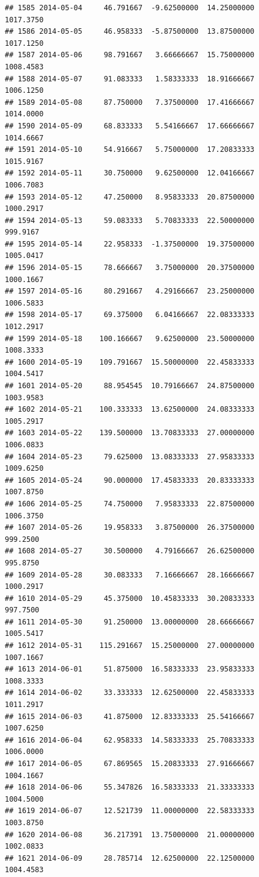 \documentclass[
]{article}
\begin{document}
\begin{verbatim}
## 1585 2014-05-04     46.791667  -9.62500000  14.25000000    1017.3750
## 1586 2014-05-05     46.958333  -5.87500000  13.87500000    1017.1250
## 1587 2014-05-06     98.791667   3.66666667  15.75000000    1008.4583
## 1588 2014-05-07     91.083333   1.58333333  18.91666667    1006.1250
## 1589 2014-05-08     87.750000   7.37500000  17.41666667    1014.0000
## 1590 2014-05-09     68.833333   5.54166667  17.66666667    1014.6667
## 1591 2014-05-10     54.916667   5.75000000  17.20833333    1015.9167
## 1592 2014-05-11     30.750000   9.62500000  12.04166667    1006.7083
## 1593 2014-05-12     47.250000   8.95833333  20.87500000    1000.2917
## 1594 2014-05-13     59.083333   5.70833333  22.50000000     999.9167
## 1595 2014-05-14     22.958333  -1.37500000  19.37500000    1005.0417
## 1596 2014-05-15     78.666667   3.75000000  20.37500000    1000.1667
## 1597 2014-05-16     80.291667   4.29166667  23.25000000    1006.5833
## 1598 2014-05-17     69.375000   6.04166667  22.08333333    1012.2917
## 1599 2014-05-18    100.166667   9.62500000  23.50000000    1008.3333
## 1600 2014-05-19    109.791667  15.50000000  22.45833333    1004.5417
## 1601 2014-05-20     88.954545  10.79166667  24.87500000    1003.9583
## 1602 2014-05-21    100.333333  13.62500000  24.08333333    1005.2917
## 1603 2014-05-22    139.500000  13.70833333  27.00000000    1006.0833
## 1604 2014-05-23     79.625000  13.08333333  27.95833333    1009.6250
## 1605 2014-05-24     90.000000  17.45833333  20.83333333    1007.8750
## 1606 2014-05-25     74.750000   7.95833333  22.87500000    1006.3750
## 1607 2014-05-26     19.958333   3.87500000  26.37500000     999.2500
## 1608 2014-05-27     30.500000   4.79166667  26.62500000     995.8750
## 1609 2014-05-28     30.083333   7.16666667  28.16666667    1000.2917
## 1610 2014-05-29     45.375000  10.45833333  30.20833333     997.7500
## 1611 2014-05-30     91.250000  13.00000000  28.66666667    1005.5417
## 1612 2014-05-31    115.291667  15.25000000  27.00000000    1007.1667
## 1613 2014-06-01     51.875000  16.58333333  23.95833333    1008.3333
## 1614 2014-06-02     33.333333  12.62500000  22.45833333    1011.2917
## 1615 2014-06-03     41.875000  12.83333333  25.54166667    1007.6250
## 1616 2014-06-04     62.958333  14.58333333  25.70833333    1006.0000
## 1617 2014-06-05     67.869565  15.20833333  27.91666667    1004.1667
## 1618 2014-06-06     55.347826  16.58333333  21.33333333    1004.5000
## 1619 2014-06-07     12.521739  11.00000000  22.58333333    1003.8750
## 1620 2014-06-08     36.217391  13.75000000  21.00000000    1002.0833
## 1621 2014-06-09     28.785714  12.62500000  22.12500000    1004.4583

\end{verbatim}
\end{document}
